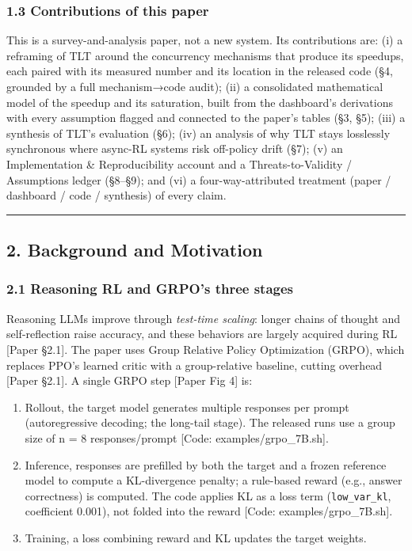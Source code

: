 \documentclass[
  11pt,
  letterpaper,
]{article}
\providecommand{\tightlist}{%
  \setlength{\itemsep}{0pt}\setlength{\parskip}{0pt}}
\begin{document}
\subsubsection{1.3 Contributions of this
paper}\label{contributions-of-this-paper}

This is a survey-and-analysis paper, not a new system. Its contributions
are: (i) a reframing of TLT around the concurrency mechanisms that
produce its speedups, each paired with its measured number and its
location in the released code (§4, grounded by a full mechanism→code
audit); (ii) a consolidated mathematical model of the speedup and its
saturation, built from the dashboard's derivations with every assumption
flagged and connected to the paper's tables (§3, §5); (iii) a synthesis
of TLT's evaluation (§6); (iv) an analysis of why TLT stays losslessly
synchronous where async-RL systems risk off-policy drift (§7); (v) an
Implementation \& Reproducibility account and a Threats-to-Validity /
Assumptions ledger (§8--§9); and (vi) a four-way-attributed treatment
(paper / dashboard / code / synthesis) of every claim.

\begin{center}\rule{0.5\linewidth}{0.5pt}\end{center}

\subsection{2. Background and
Motivation}\label{background-and-motivation}

\subsubsection{2.1 Reasoning RL and GRPO's three
stages}\label{reasoning-rl-and-grpos-three-stages}

Reasoning LLMs improve through \emph{test-time scaling}: longer chains
of thought and self-reflection raise accuracy, and these behaviors are
largely acquired during RL {[}Paper §2.1{]}. The paper uses Group
Relative Policy Optimization (GRPO), which replaces PPO's learned critic
with a group-relative baseline, cutting overhead {[}Paper §2.1{]}. A
single GRPO step {[}Paper Fig 4{]} is:

\begin{enumerate}
\def\labelenumi{\arabic{enumi}.}
\tightlist
\item
  Rollout, the target model generates multiple responses per prompt
  (autoregressive decoding; the long-tail stage). The released runs use
  a group size of n = 8 responses/prompt {[}Code:
  examples/grpo\_7B.sh{]}.
\item
  Inference, responses are prefilled by both the target and a frozen
  reference model to compute a KL-divergence penalty; a rule-based
  reward (e.g., answer correctness) is computed. The code applies KL as
  a loss term (\texttt{low\_var\_kl}, coefficient 0.001), not folded
  into the reward {[}Code: examples/grpo\_7B.sh{]}.
\item
  Training, a loss combining reward and KL updates the target weights.
\end{enumerate}
\end{document}
